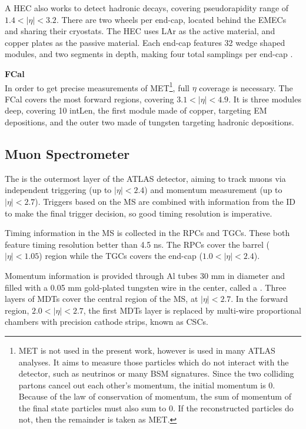 A \gls{HEC} also works to detect hadronic decays, covering pseudorapidity range of $1.4 < |\eta| < 3.2$. There are two wheels per end-cap, located behind the \glspl{EMEC} and sharing their cryostats. The \gls{HEC} uses \gls{LAr} as the active material, and copper plates as the passive material. Each end-cap features 32 wedge shaped modules, and two segments in depth, making four total samplings per end-cap \cite{lar-tdr}.


\noindent\textbf{\gls{FCal}}\\
\indent In order to get precise measurements of \gls{MET}\footnote{\gls{MET} is not used in the present work, however is used in many ATLAS analyses. It aims to measure those particles which do not interact with the detector, such as neutrinos or many \gls{BSM} signatures. Since the two colliding partons cancel out each other's momentum, the initial momentum is 0. Because of the law of conservation of momentum, the sum of momentum of the final state particles must also sum to 0. If the reconstructed particles do not, then the remainder is taken as \gls{MET}.}, full $\eta$ coverage is necessary. The \gls{FCal} covers the most forward regions, covering $3.1 < |\eta| < 4.9$. It is three modules deep, covering 10 \gls{intLen}, the first module made of copper, targeting \gls{EM} depositions, and the outer two made of tungsten targeting hadronic depositions.


\subsection{Muon Spectrometer} \label{ssec:muonspectrometer}
The  \cite{muon-tdr} is the outermost layer of the ATLAS detector, aiming to track muons via independent triggering (up to $|\eta| < 2.4$) and momentum measurement (up to $|\eta| < 2.7$). Triggers based on the \gls{MS} are combined with information from the \gls{ID} to make the final trigger decision, so good timing resolution is imperative.

Timing information in the \gls{MS} is collected in the \glspl{RPC} and \glspl{TGC}. These both feature timing resolution better than 4.5 ns. The \glspl{RPC} cover the barrel ($|\eta| < 1.05$) region while the \glspl{TGC} covers the end-cap ($1.0<|\eta|<2.4$).


Momentum information is provided through Al tubes 30 mm in diameter and filled with a 0.05 mm gold-plated tungsten wire in the center, called a . Three layers of \glspl{MDT} cover the central region of the \gls{MS}, at $|\eta| < 2.7$. In the forward region, $2.0<|\eta|<2.7$, the first \glspl{MDT} layer is replaced by multi-wire proportional chambers with precision cathode strips, known as \glspl{CSC}.

